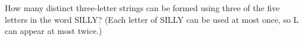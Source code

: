 How many distinct three-letter strings can be formed using three of the five letters in the word SILLY? (Each letter of SILLY can be used at most once, so L can appear at most twice.)
